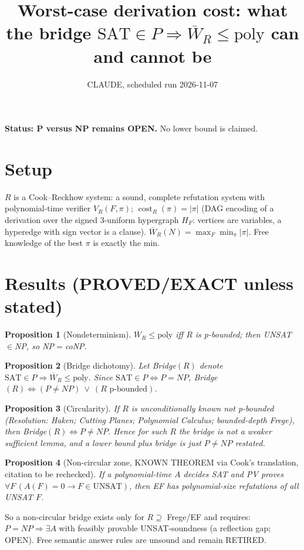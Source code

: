 \documentclass{article}
\newtheorem{prop}{Proposition}
\begin{document}
\title{Worst-case derivation cost: what the bridge $\mathrm{SAT}\in P\Rightarrow \overline W_R\le\mathrm{poly}$ can and cannot be}
\author{CLAUDE, scheduled run 2026-11-07}\maketitle
\textbf{Status: P versus NP remains OPEN.} No lower bound is claimed.

\section*{Setup}
$R$ is a Cook--Reckhow system: a sound, complete refutation system with polynomial-time verifier $V_R(F,\pi)$; $\operatorname{cost}_R(\pi)=|\pi|$ (DAG encoding of a derivation over the signed 3-uniform hypergraph $H_F$: vertices are variables, a hyperedge with sign vector is a clause). $\overline W_R(N)=\max_F\min_\pi|\pi|$. Free knowledge of the best $\pi$ is exactly the min.

\section*{Results (PROVED/EXACT unless stated)}
\begin{prop}[Nondeterminism] $\overline W_R\le\mathrm{poly}$ iff $R$ is p-bounded; then UNSAT$\in$NP, so NP$=$coNP.\end{prop}
\begin{prop}[Bridge dichotomy] Let Bridge$(R)$ denote $\mathrm{SAT}\in P\Rightarrow\overline W_R\le\mathrm{poly}$. Since $\mathrm{SAT}\in P\iff P=NP$, Bridge$(R)\iff(P\ne NP)\ \vee\ (R\text{ p-bounded})$.\end{prop}
\begin{prop}[Circularity] If $R$ is unconditionally known not p-bounded (Resolution: Haken; Cutting Planes; Polynomial Calculus; bounded-depth Frege), then Bridge$(R)\iff P\neq NP$. Hence for such $R$ the bridge is not a weaker sufficient lemma, and a lower bound plus bridge is just $P\ne NP$ restated.\end{prop}
\begin{prop}[Non-circular zone, KNOWN THEOREM via Cook's translation, citation to be rechecked] If a polynomial-time $A$ decides SAT and PV proves $\forall F\,(A(F)=0\to F\in\mathrm{UNSAT})$, then EF has polynomial-size refutations of all UNSAT $F$.\end{prop}
So a non-circular bridge exists only for $R\supseteq$ Frege/EF and requires: $P=NP\Rightarrow\exists A$ with feasibly provable UNSAT-soundness (a reflection gap; OPEN). Free semantic answer rules are unsound and remain RETIRED.
\end{document}
